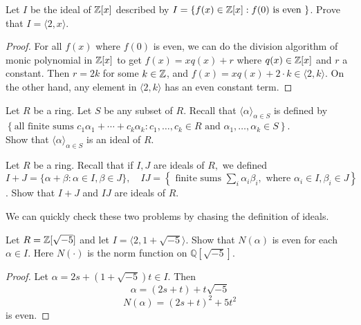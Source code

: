 \documentclass[12pt,twoside=semi,openright,numbers=noenddot]{scrbook}
\begin{document}
\begin{problem}
    Let $I$ be the ideal of $\mathbb Z[x]$ described by $I=\{f(x) \in \mathbb Z[x]: f(0) \text { is even }\}$. 
    Prove that $I=\langle 2, x\rangle$.
\end{problem}
    \begin{proof}
        For all $f(x)$ where $f(0)$ is even, we can do the division algorithm of monic polynomial in $\mathbb Z[x]$ to get 
        $f(x) = xq(x)+r$ where $q(x)\in \mathbb Z[x]$ and $r$ a constant. Then $r = 2k$ for some $k \in \mathbb Z$, and 
        $f(x) = xq(x)+2\cdot k \in \langle 2, k\rangle$. On the other hand, any element in $\langle 2,k\rangle$ has an even constant term.
    \end{proof}
\begin{problem}
    Let $R$ be a ring. Let $S$ be any subset of $R$. Recall that $\langle\alpha\rangle_{\alpha \in S}$ is defined by
    $\left\{\text {all finite sums } c_{1} \alpha_{1}+\cdots+c_{k} \alpha_{k}: c_{1}, \ldots, c_{k} \in R \text { and } \alpha_{1}, \ldots, \alpha_{k} \in S\right\}$.\\
    Show that $\langle\alpha\rangle_{\alpha \in S}$ is an ideal of $R$.
\end{problem}
\begin{problem}
    Let $R$ be a ring. Recall that if $I, J$ are ideals of $R,$ we defined
    $I+J=\{\alpha+\beta: \alpha \in I, \beta \in J\}, \quad I J=\left\{\text { finite sums } \sum_{i} \alpha_{i} \beta_{i}, \text { where } \alpha_{i} \in I, \beta_{i} \in J\right\}$.
    Show that $I+J$ and $I J$ are ideals of $R$.
\end{problem}
    We can quickly check these two problems by chasing the definition of ideals.

\begin{problem}
    Let $R=\mathbb Z[\sqrt{-5}]$ and let $I=\langle 2,1+\sqrt{-5}\rangle .$ Show that $N(\alpha)$ is even for each $\alpha \in I$.
    Here $N(\cdot)$ is the norm function on $\mathbb{Q}[\sqrt{-5}]$.
\end{problem}
    \begin{proof}
        Let $\alpha = 2s+(1+\sqrt{-5})t \in I$. Then 
        $$ \alpha = (2s+t) + t\sqrt{-5}$$
        $$ N(\alpha) = (2s+t)^2 + 5t^2$$
        is even.
    \end{proof}
\end{document}
